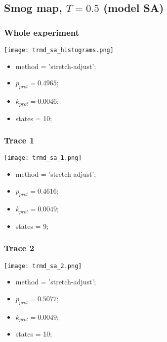 \subsection{Smog map, $T=0.5$ (model SA)}
\subsubsection{Whole experiment}
\begin{minipage}[c]{0.7\textwidth}
    \texttt{[image: trmd\_sa\_histograms.png]}
\end{minipage}
\hfill
\begin{minipage}[c]{0.45\textwidth}
    \begin{itemize}
        \item method = 'stretch-adjust';
        \item $p_{prot}=0.4965$;
        \item $k_{prot}=0.0046$;
        \item states = 10;
    \end{itemize}
\end{minipage}

\subsubsection{Trace 1}
\begin{minipage}[c]{0.7\textwidth}
    \texttt{[image: trmd\_sa\_1.png]}
\end{minipage}
\hfill
\begin{minipage}[c]{0.45\textwidth}
    \begin{itemize}
        \item method = 'stretch-adjust';
        \item $p_{prot}=0.4616$;
        \item $k_{prot}=0.0049$;
        \item states = 9;
    \end{itemize}
\end{minipage}

\subsubsection{Trace 2}
\begin{minipage}[c]{0.7\textwidth}
    \texttt{[image: trmd\_sa\_2.png]}
\end{minipage}
\hfill
\begin{minipage}[c]{0.45\textwidth}
    \begin{itemize}
        \item method = 'stretch-adjust';
        \item $p_{prot}=0.5077$;
        \item $k_{prot}=0.0049$;
        \item states = 10;
    \end{itemize}
\end{minipage}

